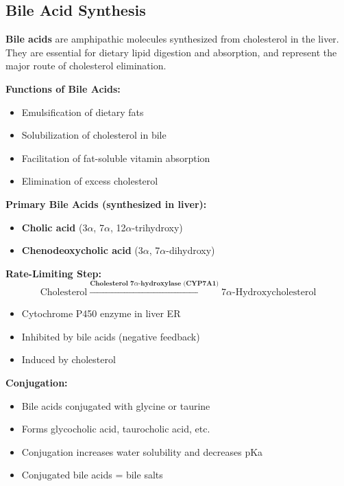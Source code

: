\subsection{Bile Acid Synthesis}

\begin{definition}
\textbf{Bile acids} are amphipathic molecules synthesized from cholesterol in the liver. They are essential for dietary lipid digestion and absorption, and represent the major route of cholesterol elimination.
\end{definition}

\textbf{Functions of Bile Acids:}
\begin{itemize}
    \item Emulsification of dietary fats
    \item Solubilization of cholesterol in bile
    \item Facilitation of fat-soluble vitamin absorption
    \item Elimination of excess cholesterol
\end{itemize}

\textbf{Primary Bile Acids (synthesized in liver):}
\begin{itemize}
    \item \textbf{Cholic acid} (3$\alpha$, 7$\alpha$, 12$\alpha$-trihydroxy)
    \item \textbf{Chenodeoxycholic acid} (3$\alpha$, 7$\alpha$-dihydroxy)
\end{itemize}

\textbf{Rate-Limiting Step:}
\[
\text{Cholesterol} \xrightarrow{\textbf{Cholesterol 7}\alpha\textbf{-hydroxylase (CYP7A1)}} \text{7}\alpha\text{-Hydroxycholesterol}
\]

\begin{itemize}
    \item Cytochrome P450 enzyme in liver ER
    \item Inhibited by bile acids (negative feedback)
    \item Induced by cholesterol
\end{itemize}

\textbf{Conjugation:}
\begin{itemize}
    \item Bile acids conjugated with glycine or taurine
    \item Forms glycocholic acid, taurocholic acid, etc.
    \item Conjugation increases water solubility and decreases pKa
    \item Conjugated bile acids = bile salts
\end{itemize}

